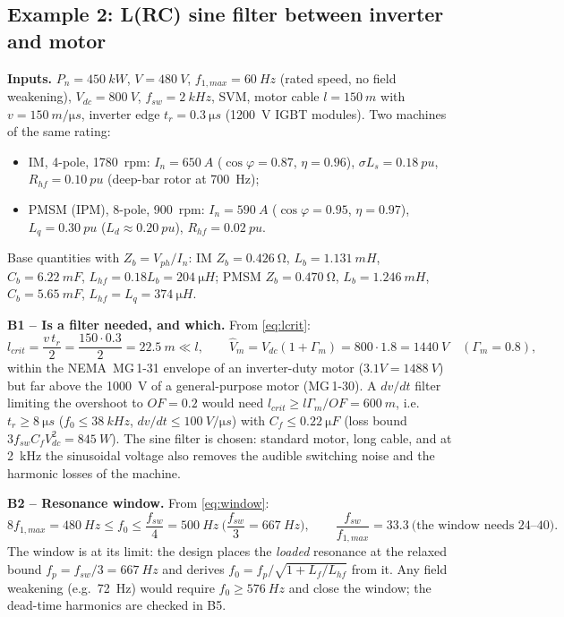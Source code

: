 \documentclass[10pt,a4paper]{scrartcl}
\newcommand{\Vdc}{V_{dc}}
\newcommand{\fsw}{f_{sw}}
\newcommand{\Lhf}{L_{hf}}
\newcommand{\Rhf}{R_{hf}}
\newcommand{\Cf}{C_{f}}
\newcommand{\Lf}{L_{f}}
\begin{document}
\begin{onehalfspace}
\subsection{Example 2: L(RC) sine filter between inverter and motor}
\label{sec:ex2}
\textbf{Inputs.} $P_n = \SI{450}{kW}$, $V = \SI{480}{V}$, $f_{1,max} = \SI{60}{Hz}$ (rated speed, no field weakening), $\Vdc = \SI{800}{V}$, $\fsw = \SI{2}{kHz}$, SVM, motor cable $l = \SI{150}{m}$ with $v = \SI{150}{m/\micro s}$, inverter edge $t_r = \SI{0.3}{\micro s}$ (\SI{1200}{V} IGBT modules). Two machines of the same rating:
\begin{itemize}
\item IM, 4-pole, \SI{1780}{rpm}: $I_n = \SI{650}{A}$ ($\cos\varphi = 0.87$, $\eta = 0.96$), $\sigma L_s = \SI{0.18}{pu}$, $\Rhf = \SI{0.10}{pu}$ (deep-bar rotor at \SI{700}{Hz});
\item PMSM (IPM), 8-pole, \SI{900}{rpm}: $I_n = \SI{590}{A}$ ($\cos\varphi = 0.95$, $\eta = 0.97$), $L_q = \SI{0.30}{pu}$ ($L_d \approx \SI{0.20}{pu}$), $\Rhf = \SI{0.02}{pu}$.
\end{itemize}
Base quantities with $Z_b = V_{ph}/I_n$: IM $Z_b = \SI{0.426}{\ohm}$, $L_b = \SI{1.131}{mH}$, $C_b = \SI{6.22}{mF}$, $\Lhf = 0.18 L_b = \SI{204}{\micro H}$; PMSM $Z_b = \SI{0.470}{\ohm}$, $L_b = \SI{1.246}{mH}$, $C_b = \SI{5.65}{mF}$, $\Lhf = L_q = \SI{374}{\micro H}$.

\textbf{B1 -- Is a filter needed, and which.} From \eqref{eq:lcrit}:
\begin{equation*}
l_{crit} = \frac{v\,t_r}{2} = \frac{150 \cdot 0.3}{2} = \SI{22.5}{m} \ll l,\qquad
\hat V_m = \Vdc(1 + \Gamma_m) = 800 \cdot 1.8 = \SI{1440}{V}\quad (\Gamma_m = 0.8),
\end{equation*}
within the NEMA~MG\,1-31 envelope of an inverter-duty motor ($3.1V = \SI{1488}{V}$) but far above the \SI{1000}{V} of a general-purpose motor (MG\,1-30). A $dv/dt$ filter limiting the overshoot to $OF = 0.2$ would need $l_{crit} \ge l\Gamma_m/OF = \SI{600}{m}$, i.e.\ $t_r \ge \SI{8}{\micro s}$ ($f_0 \le \SI{38}{kHz}$, $dv/dt \le \SI{100}{V/\micro s}$) with $\Cf \le \SI{0.22}{\micro F}$ (loss bound $3\fsw\Cf\Vdc^2 = \SI{845}{W}$). The sine filter is chosen: standard motor, long cable, and at \SI{2}{kHz} the sinusoidal voltage also removes the audible switching noise and the harmonic losses of the machine.

\textbf{B2 -- Resonance window.} From \eqref{eq:window}:
\begin{equation*}
8 f_{1,max} = \SI{480}{Hz} \le f_0 \le \frac{\fsw}{4} = \SI{500}{Hz}\ \Big(\frac{\fsw}{3} = \SI{667}{Hz}\Big),\qquad \frac{\fsw}{f_{1,max}} = 33.3\ \text{(the window needs 24--40)}.
\end{equation*}
The window is at its limit: the design places the \emph{loaded} resonance at the relaxed bound $f_p = \fsw/3 = \SI{667}{Hz}$ and derives $f_0 = f_p/\sqrt{1 + \Lf/\Lhf}$ from it. Any field weakening (e.g.\ \SI{72}{Hz}) would require $f_0 \ge \SI{576}{Hz}$ and close the window; the dead-time harmonics are checked in B5.


\end{onehalfspace}
\end{document}
